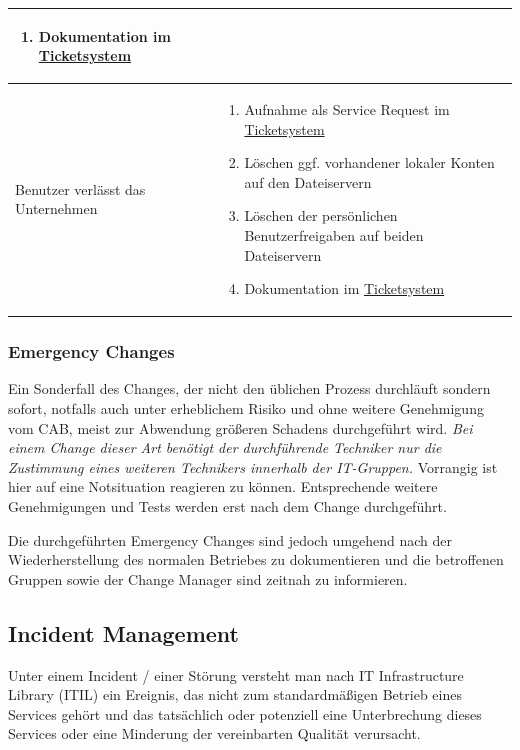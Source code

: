 \documentclass[]{article}
\begin{document}
\begin{longtable}{|p{3cm}|p{10cm}|}
\begin{enumerate}
\item
  Dokumentation im
  \href{https://docs.google.com/spreadsheets/d/1GDq3AEsVDu1a-X7tEl6qKDtSZdAXm8lsRzY6Ijw-dUQ/edit\#gid=0}{Ticketsystem}
\end{enumerate}\tabularnewline
\midrule
Benutzer verlässt das Unternehmen & \begin{enumerate}
\def\labelenumi{\arabic{enumi}.}
\item
  Aufnahme als Service Request im
  \href{https://docs.google.com/spreadsheets/d/1GDq3AEsVDu1a-X7tEl6qKDtSZdAXm8lsRzY6Ijw-dUQ/edit\#gid=0}{Ticketsystem}
\item
  Löschen ggf. vorhandener lokaler Konten auf den Dateiservern
\item
  Löschen der persönlichen Benutzerfreigaben auf beiden Dateiservern
\item
  Dokumentation im
  \href{https://docs.google.com/spreadsheets/d/1GDq3AEsVDu1a-X7tEl6qKDtSZdAXm8lsRzY6Ijw-dUQ/edit\#gid=0}{Ticketsystem}
\end{enumerate}\tabularnewline
\bottomrule
\end{longtable}

\subsubsection{Emergency Changes}\label{emergency-changes}

Ein Sonderfall des Changes, der nicht den üblichen Prozess durchläuft
sondern sofort, notfalls auch unter erheblichem Risiko und ohne weitere
Genehmigung vom CAB, meist zur Abwendung größeren Schadens durchgeführt
wird. \emph{Bei einem Change dieser Art benötigt der durchführende
Techniker nur die Zustimmung eines weiteren Technikers innerhalb der
IT-Gruppen.} Vorrangig ist hier auf eine Notsituation reagieren zu
können. Entsprechende weitere Genehmigungen und Tests werden erst nach
dem Change durchgeführt.

Die durchgeführten Emergency Changes sind jedoch umgehend nach der
Wiederherstellung des normalen Betriebes zu dokumentieren und die
betroffenen Gruppen sowie der Change Manager sind zeitnah zu
informieren.

\subsection{Incident Management}\label{incident-management}

Unter einem Incident / einer Störung versteht man nach IT Infrastructure
Library (ITIL) ein Ereignis, das nicht zum standardmäßigen Betrieb eines
Services gehört und das tatsächlich oder potenziell eine Unterbrechung
dieses Services oder eine Minderung der vereinbarten Qualität
verursacht.
\end{document}

